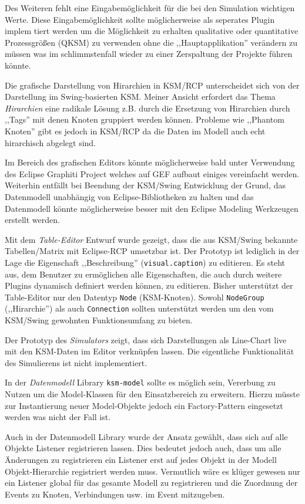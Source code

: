 \documentclass[%
12pt,titlepage,abstracton,DIV=10]{scrreprt}
\begin{document}
Des Weiteren fehlt eine Eingabemöglichkeit für die bei den Simulation wichtigen
Werte. Diese Eingabemöglichkeit sollte möglicherweise als seperates Plugin
implem tiert werden um die Möglichkeit zu erhalten qualitative oder quantitative
Prozessgrößen (QKSM) zu verwenden ohne die ,,Hauptapplikation'' verändern zu
müssen was im schlimmstenfall wieder zu einer Zerspaltung der Projekte führen
könnte.

Die grafische Darstellung von Hirarchien in KSM/RCP unterscheidet sich von der
Darstellung im Swing-basierten KSM. Meiner Ansicht erfordert das Thema
\textit{Hirarchien} eine radikale Lösung z.B. durch die Ersetzung von Hirarchien
durch ,,Tags'' mit denen Knoten gruppiert werden können. Probleme wie ,,Phantom
Knoten''\cite[S. 49]{pustelnik10} gibt es jedoch in KSM/RCP da die
Daten im Modell auch echt hirarchisch abgelegt sind.

Im Bereich des grafischen Editors könnte möglicherweise bald unter Verwendung
des Eclipse Graphiti Project welches auf GEF aufbaut einiges vereinfacht werden.
Weiterhin entfällt bei Beendung der KSM/Swing Entwicklung der Grund, das
Datenmodell unabhängig von Eclipse-Bibliotheken zu halten und das Datenmodell
könnte möglicherweise besser mit den Eclipse Modeling Werkzeugen erstellt
werden.

Mit dem \emph{Table-Editor} Entwurf wurde gezeigt, dass die aus KSM/Swing
bekannte Tabellen/Matrix mit Eclipse-RCP umsetzbar ist. Der Prototyp ist lediglich in der
Lage die Eigenschaft ,,Beschreibung'' (\texttt{visual.caption}) zu editieren. Es
steht aus, dem Benutzer zu ermöglichen alle Eigenschaften, die auch durch
weitere Plugins dynamisch definiert werden können, zu editieren.
Bisher unterstützt der Table-Editor nur den Datentyp \texttt{Node} (KSM-Knoten).
Sowohl \texttt{NodeGroup} (,,Hirarchie'') als auch \texttt{Connection} sollten
unterstützt werden um den vom KSM/Swing gewohnten Funktionsumfang zu bieten.

Der Prototyp des \emph{Simulators} zeigt, dass sich Darstellungen als Line-Chart
live mit den KSM-Daten im Editor verknüpfen lassen. Die eigentliche Funktionalität
des Simulierens ist nicht implementiert.

In der \emph{Datenmodell} Library \texttt{ksm-model} sollte es möglich sein,
Vererbung zu Nutzen um die Model-Klassen für den Einsatzbereich zu erweitern. Hierzu
müsste zur Instantierung neuer Model-Objekte jedoch ein Factory-Pattern
eingesetzt werden was nicht der Fall ist.

Auch in der Datenmodell Library wurde der Ansatz gewählt, dass sich auf alle
Objekte Listener registrieren lassen. Dies bedeutet jedoch auch, dass um alle
Änderungen zu registrieren ein Listener erst auf jedes Objekt in der Modell
Objekt-Hierarchie registriert werden muss. Vermutlich wäre es klüger gewesen nur
ein Listener global für das gesamte Modell zu registrieren und die Zuordnung der
Events zu Knoten, Verbindungen usw. im Event mitzugeben.
\end{document}
